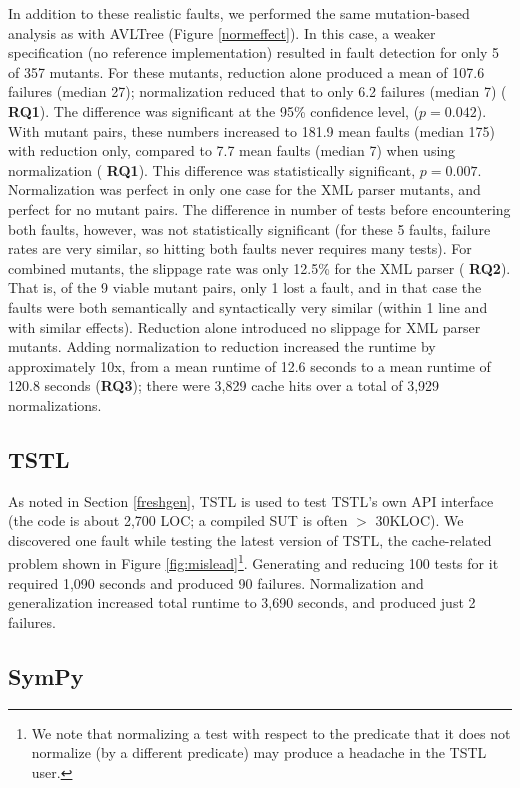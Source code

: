 In addition to these realistic faults, we performed the same
mutation-based analysis as with AVLTree (Figure \ref{normeffect}). In
this case, a weaker specification (no reference implementation)
resulted in fault detection for only 5 of 357 mutants.  For these
mutants, reduction alone produced a mean of 107.6 failures (median
27); normalization reduced that to only 6.2 failures (median 7) ({\bf
  RQ1}).  The difference was significant at the 95\% confidence level,
($p=0.042$).  With mutant pairs, these numbers
increased to 181.9 mean faults (median 175) with reduction only,
compared to 7.7 mean faults (median 7) when using normalization ({\bf
  RQ1}).  This difference was statistically significant, 
$p=0.007$.  Normalization was perfect in only one case for
the XML parser mutants, and perfect for no mutant pairs.  The
difference in number of tests before encountering both faults,
however, was not statistically significant (for these 5 faults,
failure rates are very similar, so hitting both faults never requires
many tests).  For combined
mutants, the slippage rate was only 12.5\% for the XML parser ({\bf
  RQ2}).  That is, of the 9 viable mutant pairs, only 1 lost a fault,
and in that case the faults were both semantically and syntactically
very similar (within 1 line and with similar effects).  Reduction alone introduced no slippage for XML parser
mutants.  Adding normalization to reduction increased the runtime by
approximately 10x, from a mean runtime of 12.6 seconds to a mean
runtime of 120.8 seconds ({\bf RQ3}); there were 3,829 cache hits over
a total of 3,929 normalizations.

\subsection{TSTL}

As noted in Section \ref{freshgen}, TSTL is used to test TSTL's own
API interface (the code is about 2,700 LOC; a compiled SUT is
often $>$ 30KLOC).  We discovered one fault while testing
the latest version of TSTL, the cache-related problem shown in Figure
\ref{fig:mislead}\footnote{We note that normalizing a test with
  respect to the predicate that it does not normalize (by a different
  predicate) may produce a headache in the TSTL user.}.
Generating and reducing 100 tests for it required 1,090 seconds
and produced 90 failures.  Normalization and generalization
increased total runtime to 3,690 seconds, and produced just 2
failures.

\subsection{SymPy}

